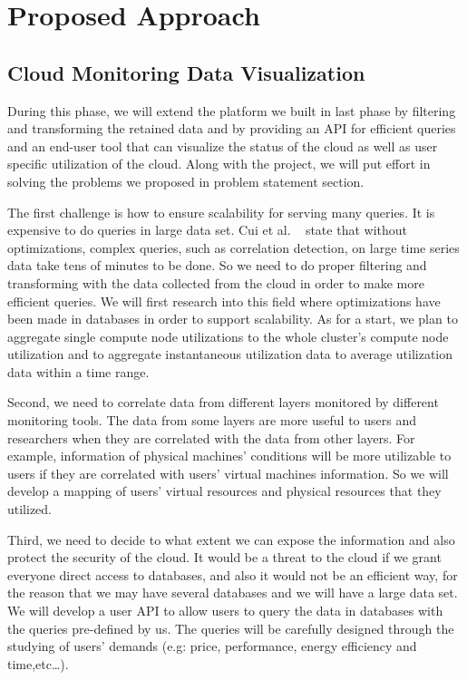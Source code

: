 \section{Proposed Approach}
\label{sec:ProposedApproach}



\subsection{Cloud Monitoring Data Visualization}
  
During this phase, we will extend the platform we built in last phase by filtering and transforming the retained data and by providing an API  for efficient queries and an end-user tool that can visualize the status of the cloud as well as user specific utilization of the cloud. Along with the project, we will put effort in solving the problems we proposed in problem statement section. 

The first challenge is how to ensure scalability for serving many queries. It is expensive to do queries in large data set. Cui et al. ~\cite{cuiusing} state that without optimizations, complex queries, such as correlation detection, on large time series data take tens of minutes to be done. So we need to do proper filtering and transforming with the data collected from the cloud in order to make more efficient queries. We will first research into this field where optimizations have been made in databases in order to support scalability. As for a start, we plan to aggregate single compute node utilizations to the whole cluster’s compute node utilization and to aggregate  instantaneous utilization data to average utilization data within a time range. 

Second, we need to correlate data from different layers monitored by different monitoring tools. The data from some layers are more useful to users and researchers when they are correlated with the data from other layers. For example, information of physical machines’ conditions will be more utilizable to users if they are correlated with users’ virtual machines information. So we will develop a mapping of users’ virtual resources and physical resources that they utilized. 

Third, we need to decide to what extent we can expose the information and also protect the security of the cloud. It would be a threat to the cloud if we grant everyone direct access to databases, and also it would not be an efficient way, for the reason that we may have several databases and we will have a large data set. We will develop a user API to allow users to query the data in databases with the queries pre-defined by us. The queries will be carefully designed through the studying of users’ demands (e.g: price, performance, energy efficiency and time,etc…).

